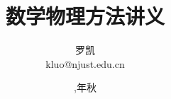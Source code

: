 
\title{\heiti 数学物理方法讲义}
\subtitle{}
\author{\kaishu 罗凯\\
kluo@njust.edu.cn}


\date{\fangsong {},年秋}



  
    
    
    
    
    
    

